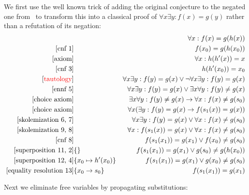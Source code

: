 \documentclass[onehalfspacing]{article}
\theoremstyle{definition}
\theoremstyle{definition}
\theoremstyle{definition}
\theoremstyle{definition}
\theoremstyle{definition}
\theoremstyle{definition}
\begin{document}
We first use the well known trick of adding the original conjecture to the negated one from~\cite{Luckham_1971} to transform this into a classical proof of $\forall x\exists y: f(x) = g(y)$ rather than a refutation of its negation:
\setcounter{equation}{0}
\begin{align}
	[\text{axiom}]&&\forall x: f(x) = g(h(x))\\
	[\text{cnf 1}]&&f(x_0) = g(h(x_0))\\
	[\text{axiom}]&&\forall x: h(h'(x)) = x\\
	[\text{cnf 3}]&&h(h'(x_0)) = x_0\\
	[\text{\color{red}{tautology}}]&&\forall x\exists y: f(y) = g(x)\vee\neg\forall x\exists y: f(y) = g(x)\\
	[\text{ennf 5}]&&\forall x\exists y: f(y) = g(x)\vee\exists x\forall y: f(y)\neq g(x)\\
	[\text{choice axiom}]&&\exists x\forall y: f(y)\neq g(x)\rightarrow \forall x : f(x) \neq g(s_0)\\
	[\text{choice axiom}]&&\forall x(\exists y: f(y)= g(x)\rightarrow f(s_1(x)) = g(x))\\
	[\text{skolemization 6, 7}]&&\forall x\exists y: f(y) = g(x)\vee\forall x: f(x)\neq g(s_0)\\
	[\text{skolemization 9, 8}]&&\forall x: f(s_1(x)) = g(x)\vee\forall x: f(x)\neq g(s_0)\\
	[\text{cnf 8}]&&f(s_1(x_1)) = g(x_1)\vee f(x_0)\neq g(s_0)\\
	[\text{superposition 11, 2}]&\{\}&f(s_1(x_1)) = g(x_1)\vee g(s_0)\neq g(h(x_0))\\
	[\text{superposition 12, 4}]&\{x_0\mapsto h'(x_0)\}&f(s_1(x_1)) = g(x_1)\vee g(x_0)\neq g(s_0)\\
	[\text{equality resolution 13}]&\{x_0\to s_0\}&f(s_1(x_1)) = g(x_1)
\end{align}

Next we eliminate free variables by propagating substitutions:
\end{document}
